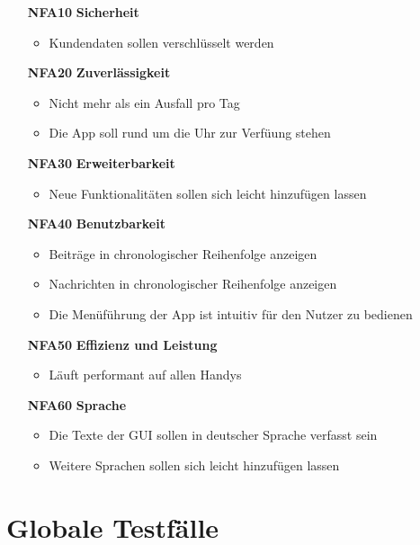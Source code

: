 \documentclass[parskip=full]{scrartcl}
\begin{document}
			\begin{itemize}
				\item[\textbf{NFA10}] \textbf{Sicherheit}
					\begin{itemize}[nosep]
						\item Kundendaten sollen verschlüsselt werden
					\end{itemize}
				\item[\textbf{NFA20}] \textbf{Zuverlässigkeit}
					\begin{itemize}[nosep]
						\item Nicht mehr als ein Ausfall pro Tag
						\item Die App soll rund um die Uhr zur Verfüung stehen
					\end{itemize}
				\item[\textbf{NFA30}] \textbf{Erweiterbarkeit}
					\begin{itemize}[nosep]
						\item Neue Funktionalitäten sollen sich leicht hinzufügen lassen
					\end{itemize}
				\item[\textbf{NFA40}] \textbf{Benutzbarkeit}
					\begin{itemize}[nosep]
						\item Beiträge in chronologischer Reihenfolge anzeigen
						\item Nachrichten in chronologischer Reihenfolge anzeigen
						\item 	Die Menüführung der App ist intuitiv für den Nutzer zu bedienen
					\end{itemize}
				\item[\textbf{NFA50}] \textbf{Effizienz und Leistung}
					\begin{itemize}[nosep]
						\item Läuft performant auf allen Handys
					\end{itemize}
				\item[\textbf{NFA60}] \textbf{Sprache}
					\begin{itemize}[nosep]
						\item Die Texte der GUI sollen in deutscher Sprache verfasst sein
						\item Weitere Sprachen sollen sich leicht hinzufügen lassen
					\end{itemize}
			\end{itemize}	
	
	\newpage
	\section{Globale Testfälle}
	
\end{document}
